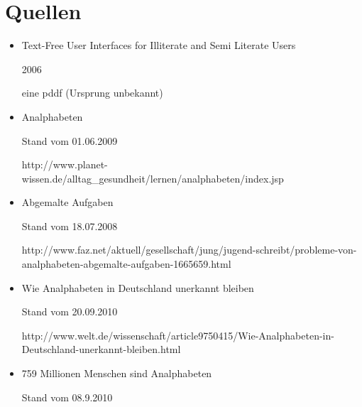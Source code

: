 \newpage 



\thispagestyle{empty}



 \section*{Quellen}




\begin{itemize}


  \item {}

					{Text-Free User Interfaces for Illiterate and Semi Literate Users}

										{2006}

										{eine pddf (Ursprung unbekannt)}



	\item {}

										{Analphabeten}

										{Stand vom 01.06.2009}

										{http://www.planet-wissen.de/alltag_gesundheit/lernen/analphabeten/index.jsp}

										


	\item {}

										{Abgemalte Aufgaben}

										{Stand vom 18.07.2008}

										{http://www.faz.net/aktuell/gesellschaft/jung/jugend-schreibt/probleme-von-analphabeten-abgemalte-aufgaben-1665659.html}									


	\item {}

										{Wie Analphabeten in Deutschland unerkannt bleiben}

										{Stand vom 20.09.2010}

										{http://www.welt.de/wissenschaft/article9750415/Wie-Analphabeten-in-Deutschland-unerkannt-bleiben.html}	


	\item {}

										{759 Millionen Menschen sind Analphabeten}

										{Stand vom 08.9.2010}


\end{itemize}
